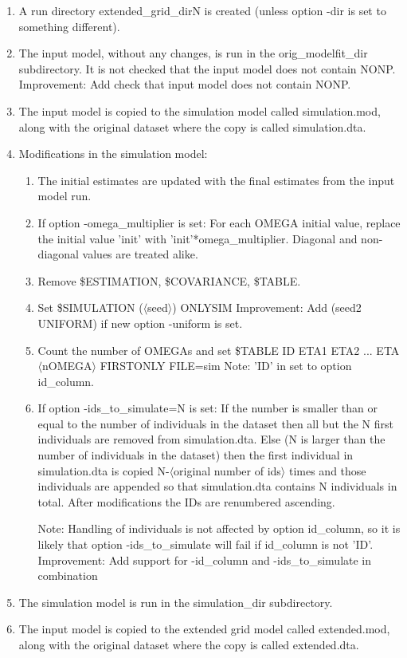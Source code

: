 	\begin{enumerate}
		\item A run directory extended\_grid\_dirN is created (unless option -dir is set to something different).
		\item The input model, without any changes, is run in the orig\_modelfit\_dir subdirectory. It is not checked that the input model does not contain NONP. Improvement: Add check that input model does not contain NONP.
		\item The input model is copied to the simulation model called simulation.mod, along with the original dataset where the copy is called simulation.dta. 
																											   
										 
		\item Modifications in the simulation model:
		\begin{enumerate}
			\item The initial estimates are updated with the final estimates from the input model run.
			\item If option -omega\_multiplier is set: For each OMEGA initial value, replace the initial value 'init' with 'init'*omega\_multiplier. Diagonal and non-diagonal values are treated alike. 
																				
			\item Remove \$ESTIMATION, \$COVARIANCE, \$TABLE.
			\item Set \$SIMULATION ($\langle$seed$\rangle$) ONLYSIM
			Improvement: Add (seed2 UNIFORM) if new option -uniform is set.
			\item Count the number of OMEGAs and set 
			\$TABLE ID ETA1 ETA2 ... ETA$\langle$nOMEGA$\rangle$ FIRSTONLY FILE=sim
			Note: 'ID' in set to option id\_column.
			\item If option -ids\_to\_simulate=N is set: If the number is smaller than or equal to the number of individuals in the dataset then all but the N first individuals are removed from simulation.dta. Else (N is larger than the number of individuals in the dataset) then the first individual in simulation.dta is copied N-$\langle$original number of ids$\rangle$ times and those individuals are appended so that simulation.dta contains N individuals in total. After modifications the IDs are renumbered ascending.
																												  
																												  
																												
																 
			Note: Handling of individuals is not affected by option id\_column, so it is likely that option -ids\_to\_simulate will fail if id\_column is not 'ID'. 
			Improvement: Add support for -id\_column and -ids\_to\_simulate in combination
		\end{enumerate}
		\item The simulation model is run in the simulation\_dir subdirectory.
		\item The input model is copied to the extended grid model called extended.mod, along with the original dataset where the copy is called extended.dta. 
					 

\end{enumerate}
